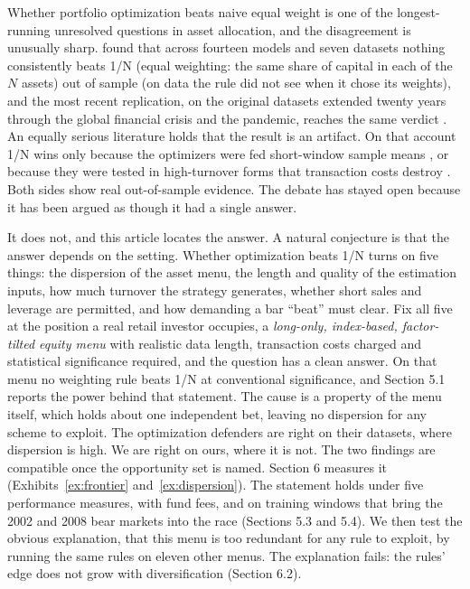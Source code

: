 \documentclass[12pt,letterpaper]{article}
\newcommand{\quita}[1]{{\color{quitarc}#1}}
\newcommand{\nuevo}[1]{{\color{nuevoc}#1}}
\begin{document}
Whether portfolio optimization beats naive equal weight is one of the
longest-running unresolved questions in asset allocation, and the disagreement
is unusually sharp. \citet{demiguel2009} found that across fourteen models and
seven datasets nothing consistently beats 1/N\nuevo{ (equal weighting: the same share of capital in each of the $N$ assets)} out of sample\nuevo{ (on data the rule did not see when it chose its weights)}, and the most recent
replication, on the original datasets extended twenty years through the global
financial crisis and the pandemic, reaches the same verdict
\citep{gelmini2024}. An equally serious literature holds that the result is an
artifact. On that account 1/N wins only because the optimizers were fed
short-window sample means \citep{kritzman2010}, or because they were tested in
high-turnover forms that transaction costs destroy \citep{kirby2012}. Both sides
show real out-of-sample evidence. The debate has stayed open because it has been
argued as though it had a single answer.

\quita{It does not, and this article locates the answer.} \nuevo{A natural conjecture is that the
answer depends on the setting.} Whether optimization beats 1/N
turns on five things: the dispersion of the asset menu, the length and quality of
the estimation inputs, how much turnover the strategy generates, whether short
sales and leverage are permitted, and how demanding a bar ``beat'' must clear.
Fix all five at the position a real retail investor occupies, a \emph{long-only, index-based, factor-tilted equity menu} with realistic data length, transaction
costs charged and statistical significance required, and the question has a clean answer. On that menu no weighting rule beats 1/N at
conventional significance, and Section 5.1 reports the power behind that statement. \quita{The cause is a property of the menu
itself, which holds about one independent bet, leaving no dispersion for any
scheme to exploit. The optimization defenders are right on their datasets, where
dispersion is high. We are right on ours, where it is not. The two findings are
compatible once the opportunity set is named. Section 6 measures it
(Exhibits~\ref{ex:frontier} and~\ref{ex:dispersion}).} \nuevo{The statement holds under five
performance measures, with fund fees, and on training windows that bring the 2002 and 2008 bear
markets into the race (Sections 5.3 and 5.4). We then test the obvious explanation, that this menu
is too redundant for any rule to exploit, by running the same rules on eleven other menus. The
explanation fails: the rules' edge does not grow with diversification (Section 6.2).}
\end{document}
